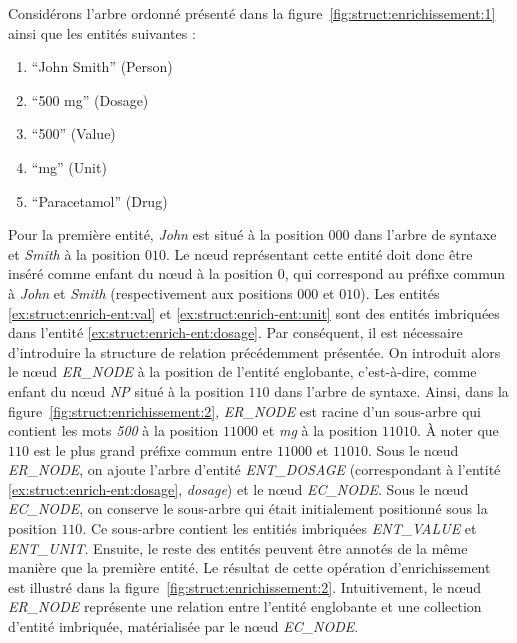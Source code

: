\begin{example}
    Considérons l'arbre ordonné présenté dans la figure~\ref{fig:struct:enrichissement:1} ainsi que les entités suivantes :
    \begin{multicols}{3}
        \begin{enumerate}
            \item \enquote{John Smith} (Person) \label{ex:struct:enrich-ent:person}
            \item \enquote{500 mg} (Dosage) \label{ex:struct:enrich-ent:dosage}
            \item \enquote{500} (Value) \label{ex:struct:enrich-ent:val}
            \item \enquote{mg} (Unit) \label{ex:struct:enrich-ent:unit}
            \item \enquote{Paracetamol} (Drug) \label{ex:struct:enrich-ent:drug}
        \end{enumerate}
    \end{multicols}

    Pour la première entité, \emph{John} est situé à la position $000$ dans l'arbre de syntaxe et \emph{Smith} à la position $010$.
    Le nœud représentant cette entité doit donc être inséré comme enfant du nœud à la position $0$, qui correspond au préfixe commun à \emph{John} et \emph{Smith} (respectivement aux positions $000$ et $010$).
    Les entités \ref{ex:struct:enrich-ent:val} et \ref{ex:struct:enrich-ent:unit} sont des entités imbriquées dans l'entité \ref{ex:struct:enrich-ent:dosage}.
    Par conséquent, il est nécessaire d'introduire la structure de relation précédemment présentée.
    On introduit alors le nœud \emph{ER\_NODE} à la position de l'entité englobante, c'est-à-dire, comme enfant du nœud \emph{NP} situé à la position $110$ dans l'arbre de syntaxe.
    Ainsi, dans la figure~\ref{fig:struct:enrichissement:2}, \emph{ER\_NODE} est racine d'un sous-arbre qui contient les mots \emph{500} à la position $11000$ et \emph{mg} à la position $11010$.
    À noter que $110$ est le plus grand préfixe commun entre $11000$ et  $11010$.
    Sous le nœud \emph{ER\_NODE}, on ajoute l'arbre d'entité \emph{ENT\_DOSAGE} (correspondant à l'entité \ref{ex:struct:enrich-ent:dosage}, \emph{dosage}) et le nœud \emph{EC\_NODE}.
    Sous le nœud \emph{EC\_NODE}, on conserve le sous-arbre qui était initialement positionné sous la position $110$.
    Ce sous-arbre contient les entitiés imbriquées \emph{ENT\_VALUE} et \emph{ENT\_UNIT}.
    Ensuite, le reste des entités peuvent être annotés de la même manière que la première entité.
    Le résultat de cette opération d'enrichissement est illustré dans la figure~\ref{fig:struct:enrichissement:2}.
    Intuitivement, le nœud \emph{ER\_NODE} représente une relation entre l'entité englobante et une collection d'entité imbriquée, matérialisée par le nœud \emph{EC\_NODE}.
\end{example}

